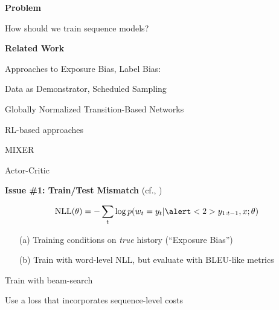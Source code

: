 \documentclass{beamer}
\let\tempone\itemize
\let\temptwo\enditemize
\renewenvironment{itemize}{\tempone\addtolength{\itemsep}{0.5\baselineskip}}{\temptwo}
\newcommand{\air}{\vspace{0.25cm}}
\newcommand{\Cite}[1]{{\footnotesize \citep{#1}}}
\begin{document}
 \begin{frame}
   \begin{center}
     \textbf{Problem}
   \end{center}


     How should we train sequence models?
     
     \pause
   \begin{center}
     \textbf{Related Work}
   \end{center}
   \begin{itemize}
   \item Approaches to Exposure Bias, Label Bias:
  \begin{itemize}
  \item Data as Demonstrator, Scheduled Sampling \citep{Venkatraman,bengio15scheduled}
  \item Globally Normalized Transition-Based Networks \citep{Andor2016}
  \end{itemize}
  \air
  \item RL-based approaches
  \begin{itemize}
  \item MIXER \citep{ranzato16sequence}
  \item Actor-Critic \citep{Bahdanau2016}
  \end{itemize}
  \air
\end{itemize}
 \end{frame}


\begin{frame}

  \begin{center}
    \textbf{\alert{Issue \#1}: Train/Test Mismatch} (cf.,
    \Cite{ranzato16sequence})
  \end{center}
\air
\begin{align*}
\text{NLL}(\theta) = -\sum_{t} \log p(w_{t} = y_t | \alert<2>{y_{1:t-1}}, x; \theta) 
\end{align*}

\begin{enumerate}
\item[(a)] Training conditions on \textit{true} history (``Exposure Bias'')
\item[(b)] Train with word-level NLL, but evaluate with BLEU-like metrics
\end{enumerate}

\air
\air
\air
\pause
\textbf{} Train with beam-search
\air
\begin{itemize}
\item Use a loss that incorporates sequence-level costs
\end{itemize}


\end{frame}
\end{document}
